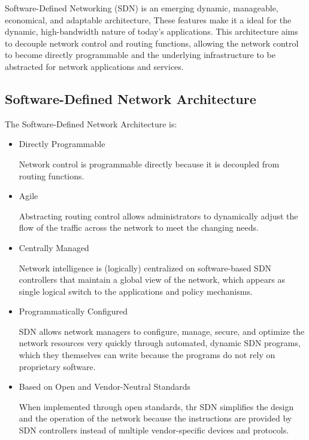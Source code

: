 \documentclass[
  oneside,
  11pt, a4paper,
  footinclude=true,
  headinclude=true,
  cleardoublepage=empty
]{scrbook}
\begin{document}
Software-Defined Networking (SDN) is an emerging dynamic, manageable, economical, and adaptable architecture, These features make it a ideal for the dynamic, high-bandwidth nature of today’s applications. This architecture aims to decouple network control and routing functions, allowing the network control to become directly programmable and the underlying infrastructure to be abstracted for network applications and services.

\subsection{Software-Defined Network Architecture}
\label{Software-Defined Network Architecture}

The Software-Defined Network Architecture is:

\begin{itemize}
    \item Directly Programmable\par
Network control is programmable directly because it is decoupled from routing functions.
    \item Agile \par
Abstracting routing control allows administrators to dynamically adjust the flow of the traffic across the network to meet the changing needs.
    \item Centrally Managed\par
Network intelligence is (logically) centralized on software-based SDN controllers that maintain a global view of the network, which appears as single logical switch to the applications and  policy mechanisms.
    \item Programmatically Configured \par
SDN allows network managers to configure, manage, secure, and optimize the network resources very quickly through automated, dynamic SDN programs, which they themselves can write because the programs do not rely on proprietary software.
    \item   Based on Open and Vendor-Neutral Standards \par
When implemented through open standards, thr SDN simplifies the design and the operation of the network because the instructions are provided by SDN controllers instead of multiple vendor-specific devices and protocols.
\end{itemize}
\end{document}

